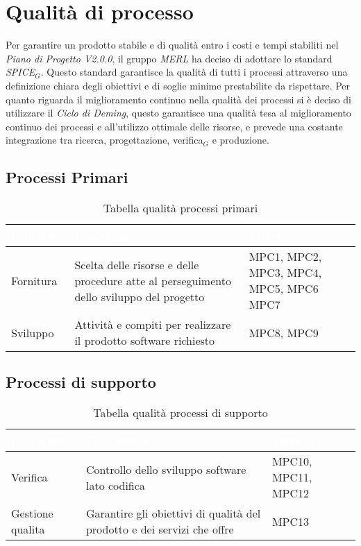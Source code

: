 \chapter{Qualità di processo}
Per garantire un prodotto stabile e di qualità entro i costi e tempi stabiliti nel \textit{Piano di Progetto V2.0.0}, il gruppo \textit{MERL} ha deciso di adottare lo standard \textit{SPICE}$_G$. Questo standard garantisce la qualità di tutti i processi attraverso una definizione chiara degli obiettivi e di soglie minime prestabilite da rispettare.
Per quanto riguarda il miglioramento continuo nella qualità dei processi si è deciso di utilizzare il \textit{Ciclo di Deming}, questo garantisce una qualità tesa al miglioramento continuo dei processi e all'utilizzo ottimale delle risorse, e prevede una costante integrazione tra ricerca, progettazione, verifica$_G$ e produzione.

\section{Processi Primari}
\begin{table}[H]
  \renewcommand{\arraystretch}{1.25}
  \begin{tabular}{|p{2.5cm}|p{8cm}|p{3cm}|} \hline
    \rowcolor[HTML]{036400}
    \textcolor{white}{\textbf{Obiettivo}} & \textcolor{white}{\textbf{Descrizione}} & \textcolor{white}{\textbf{Metrica}}  \\ \hline
    \rowcolor[HTML]{EFEFEF}
    Fornitura & Scelta delle risorse e delle procedure atte al perseguimento dello sviluppo del progetto & MPC1, MPC2, \newline MPC3, MPC4, \newline MPC5, MPC6 \newline MPC7     \\ \hline
    \rowcolor[HTML]{C0C0C0}
    Sviluppo & Attività e compiti per realizzare il prodotto software richiesto & MPC8, MPC9 \\ \hline
  \end{tabular}
  \caption{Tabella qualità processi primari}
\end{table}


\section{Processi di supporto}
\begin{table}[H]
  \renewcommand{\arraystretch}{1.25}
  \begin{tabular}{|p{2.5cm}|p{8cm}|p{1.7cm}|} \hline
    \rowcolor[HTML]{036400}
    \textcolor{white}{\textbf{Obiettivo}} & \textcolor{white}{\textbf{Descrizione}} & \textcolor{white}{\textbf{Metrica}}  \\ \hline
    \rowcolor[HTML]{EFEFEF}
    Verifica & Controllo dello sviluppo software lato codifica & MPC10, MPC11, MPC12  \\ \hline
    \rowcolor[HTML]{C0C0C0}
    Gestione qualita & Garantire gli obiettivi di qualità del prodotto e dei servizi che offre & MPC13  \\ \hline
  \end{tabular}
  \caption{Tabella qualità processi di supporto}
\end{table}


